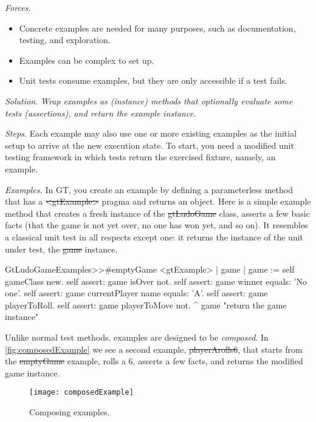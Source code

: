 \documentclass[sigconf,screen]{acmart}
\newcommand\cp[1]{\nbe{Cesare}{#1}{olive}} %
\newcommand\dd[1]{\nbe{Daniel}{#1}{magenta}} %
\newcommand{\patsec}[1]{\noindent\textit{#1.}\xspace}
\begin{document}
\patsec{Forces}
\begin{itemize}[---]
\item Concrete examples are needed for many purposes, such as documentation, testing, and exploration.
\item Examples can be complex to set up.
\item Unit tests consume examples, but they are only accessible if a test fails.
\end{itemize}

\patsec{Solution}
\emph{Wrap examples as (instance) methods that optionally evaluate some tests (assertions), 
and return the example instance.}

\patsec{Steps}
Each example may also use one or more existing examples as the initial setup to arrive at the new execution state.
To start, you need a modified unit testing framework in which tests return the exercised fixture, namely, an example.

\patsec{Examples}
In GT, you create an example by defining a parameterless method that has a \st{<gtExample>} pragma and returns an object.
Here is a simple example method that creates a fresh instance of the \st{gtLudoGame} class, asserts a few basic facts (\ie that the game is not yet over, no one has won yet, and so on).
It resembles a classical unit test in all respects except one: it returns the instance of the unit under test, \ie the \st{game} instance.


\begin{code}
GtLudoGameExamples>>#emptyGame
	<gtExample>
	| game |
	game := self gameClass new.
	self assert: game isOver not.
	self assert: game winner equals: 'No one'.
	self assert: game currentPlayer name equals: 'A'.
	self assert: game playerToRoll.
	self assert: game playerToMove not.
	^ game  "return the game instance"
\end{code}

Unlike normal test methods, examples are designed to be \emph{composed}.
In \autoref{fig:composedExample} we see a second example, \st{playerArolls6}, that starts from the \st{emptyGame} example, rolls a $6$, asserts a few facts, and returns the modified game instance.

\begin{figure}[h]
  \texttt{[image: composedExample]}
  \caption{Composing examples.}
  \label{fig:composedExample}
\end{figure}
\end{document}
